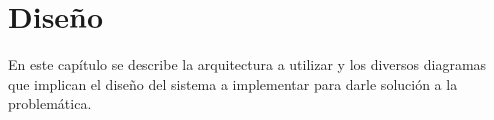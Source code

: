 \chapter{Diseño }\label{chap: Diseno}
En este capítulo se describe la arquitectura a utilizar y los diversos diagramas que implican el diseño del sistema a implementar para darle solución a la problemática.


\clearpage




\clearpage
 